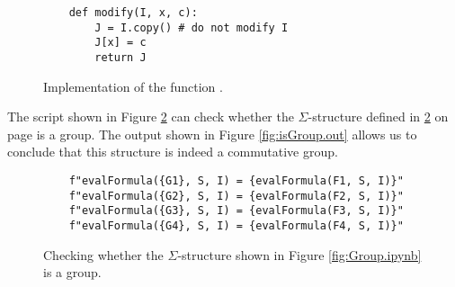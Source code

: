 \begin{figure}[!ht]
\centering
\begin{verbatim}
    def modify(I, x, c):
        J = I.copy() # do not modify I       
        J[x] = c
        return J
\end{verbatim}
\vspace*{-0.3cm}
\caption{Implementation of the function .}
\label{fig:modify.ipynb}
\end{figure}



The  script shown in Figure \ref{fig:isGroup.ipynb} can check whether the $\Sigma$-structure defined in
\ref{fig:isGroup.ipynb} on page \pageref{fig:isGroup.ipynb} is a group. The output shown in Figure
\ref{fig:isGroup.out} allows us to conclude that this structure is indeed a commutative group. 


\begin{figure}[!ht]
\centering
\begin{verbatim}
    f"evalFormula({G1}, S, I) = {evalFormula(F1, S, I)}"
    f"evalFormula({G2}, S, I) = {evalFormula(F2, S, I)}"
    f"evalFormula({G3}, S, I) = {evalFormula(F3, S, I)}"
    f"evalFormula({G4}, S, I) = {evalFormula(F4, S, I)}"
\end{verbatim}
\vspace*{-0.3cm}
\caption{Checking whether the $\Sigma$-structure shown in Figure \ref{fig:Group.ipynb} is a group.}
\label{fig:isGroup.ipynb}
\end{figure}

